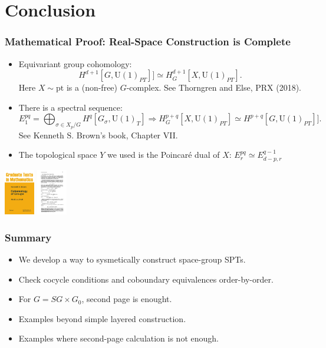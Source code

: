 \documentclass[xcolor=table, 11pt, aspectratio=169]{beamer}
\newcommand{\uone}{\mathrm U(1)}
\begin{document}
\section{Conclusion}

\begin{frame}
\frametitle{Mathematical Proof: Real-Space Construction is Complete}
\begin{itemize}
\item Equivariant group cohomology:
\[H^{d+1}[G, \uone_{PT}]]\simeq H^{d+1}_G[X, \uone_{PT}].\]
Here $X\sim\text{pt}$ is a (non-free) $G$-complex. See Thorngren and Else, PRX (2018).
\item There is a spectral sequence:
\[E_1^{pq}=\bigoplus_{\sigma\in X_p/G}H^q[G_\sigma,\uone_T]\Rightarrow
H^{p+q}_G[X,\uone_{PT}]\simeq H^{p+q}[G, \uone_{PT}]].\]
See Kenneth S. Brown's book, Chapter VII.
\item The topological space $Y$ we used is the Poincar\'e dual of $X$: $E^{pq}_r\simeq E^{q-1}_{d-p,r}$
\end{itemize}
\begin{center}
	\includegraphics[height=2cm]{brown_book}
	\includegraphics[height=2cm]{brown_ss}
\end{center}
\end{frame}

\begin{frame}
\frametitle{Summary}
\begin{itemize}
\item We develop a way to sysmetically construct space-group SPTs.
\item Check cocycle conditions and coboundary equivalences order-by-order.
\item For $G=SG\times G_0$, second page is enought.
\item Examples beyond simple layered construction.
\item Examples where second-page calculation is not enough.
\end{itemize}
\end{frame}
\end{document}
